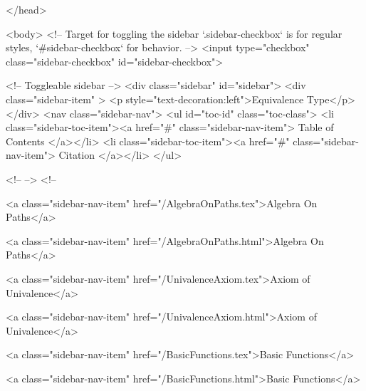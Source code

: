   
</head>




  <body>
    <!-- Target for toggling the sidebar `.sidebar-checkbox` is for regular
     styles, `#sidebar-checkbox` for behavior. -->
<input type="checkbox" class="sidebar-checkbox" id="sidebar-checkbox">

<!-- Toggleable sidebar -->
<div class="sidebar" id="sidebar">
  <div class="sidebar-item" >
    <p style="text-decoration:left">Equivalence Type</p>
  </div>
  <nav class="sidebar-nav">
    <ul id="toc-id" class="toc-class">
  <li class="sidebar-toc-item"><a href="#" class="sidebar-nav-item"> Table of Contents </a></li>
  <li class="sidebar-toc-item"><a href="#" class="sidebar-nav-item"> Citation </a></li>
</ul>


    <!--  -->
    <!-- 
      
    
      
    
      
    
      
        
      
    
      
        
          <a class="sidebar-nav-item" href="/AlgebraOnPaths.tex">Algebra On Paths</a>
        
      
    
      
        
          <a class="sidebar-nav-item" href="/AlgebraOnPaths.html">Algebra On Paths</a>
        
      
    
      
        
          <a class="sidebar-nav-item" href="/UnivalenceAxiom.tex">Axiom of Univalence</a>
        
      
    
      
        
          <a class="sidebar-nav-item" href="/UnivalenceAxiom.html">Axiom of Univalence</a>
        
      
    
      
        
          <a class="sidebar-nav-item" href="/BasicFunctions.tex">Basic Functions</a>
        
      
    
      
        
          <a class="sidebar-nav-item" href="/BasicFunctions.html">Basic Functions</a>
        
      
    
      
        
